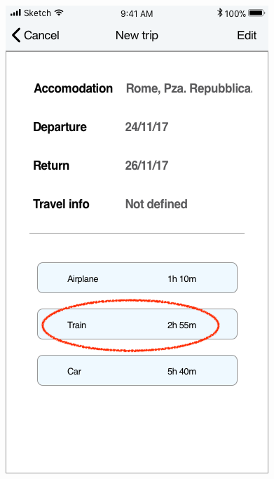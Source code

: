 \begin{figure}[H]
	\centering
	\includegraphics[scale=0.23]{Images/Interface/Trips/7_trip_definition}
	\hspace{0.5cm}

\end{figure}
